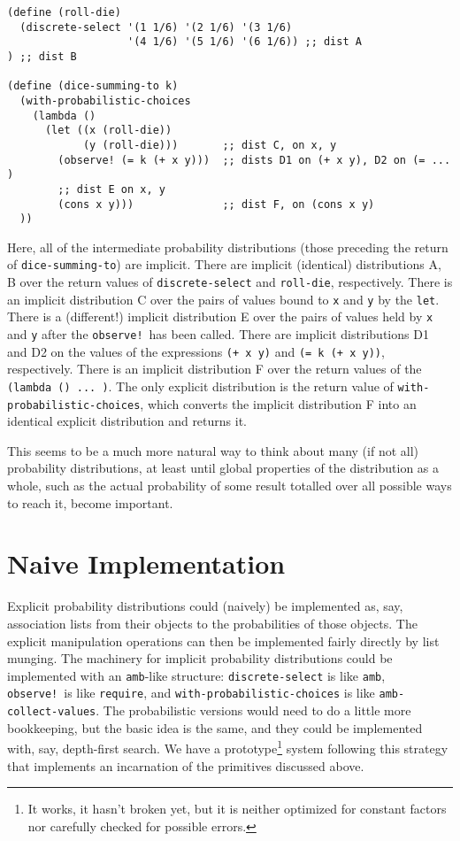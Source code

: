 \documentclass[12pt]{article}
\newcommand{\code}[1]{\texttt{#1}}
\begin{document}
\begin{verbatim}
(define (roll-die)
  (discrete-select '(1 1/6) '(2 1/6) '(3 1/6)
                   '(4 1/6) '(5 1/6) '(6 1/6)) ;; dist A
) ;; dist B

(define (dice-summing-to k)
  (with-probabilistic-choices
    (lambda ()
      (let ((x (roll-die))
            (y (roll-die)))       ;; dist C, on x, y
        (observe! (= k (+ x y)))  ;; dists D1 on (+ x y), D2 on (= ... )
        ;; dist E on x, y
        (cons x y)))              ;; dist F, on (cons x y)
  ))
\end{verbatim}

Here, all of the intermediate probability distributions (those
preceding the return of \code{dice-summing-to}) are implicit.  There
are implicit (identical) distributions A, B over the return values of
\code{discrete-select} and \code{roll-die}, respectively.  There is an
implicit distribution C over the pairs of values bound to \code{x} and
\code{y} by the \code{let}.  There is a (different!) implicit
distribution E over the pairs of values held by \code{x} and \code{y}
after the \code{observe!}\ has been called.  There are implicit
distributions D1 and D2 on the values of the expressions \code{(+ x
y)} and \code{(= k (+ x y))}, respectively.  There is an implicit
distribution F over the return values of the \code{(lambda () ... )}.
The only explicit distribution is the return value of
\code{with-probabilistic-choices}, which converts the implicit
distribution F into an identical explicit distribution and returns it.

This seems to be a much more natural way to think about many (if
not all) probability distributions, at least until global properties
of the distribution as a whole, such as the actual probability of some
result totalled over all possible ways to reach it, become important.

\section{Naive Implementation}
\label{naive}

Explicit probability distributions could (naively) be implemented as,
say, association lists from their objects to the probabilities of
those objects.  The explicit manipulation operations can then be 
implemented fairly directly by list munging.  
The machinery for implicit probability distributions
could be implemented with an \code{amb}-like structure:
\code{discrete-select} is like \code{amb}, \code{observe!}\ is like
\code{require}, and \code{with-probabilistic-choices} is like
\code{amb-collect-values}.  The probabilistic versions would need to
do a little more bookkeeping, but the basic idea is the same, and they
could be implemented with, say, depth-first search.  We have a 
prototype\footnote{It works, it hasn't broken yet, but it is neither
optimized for constant factors nor carefully checked for possible
errors.} system following this strategy that implements an incarnation
of the primitives discussed above.
\end{document}
